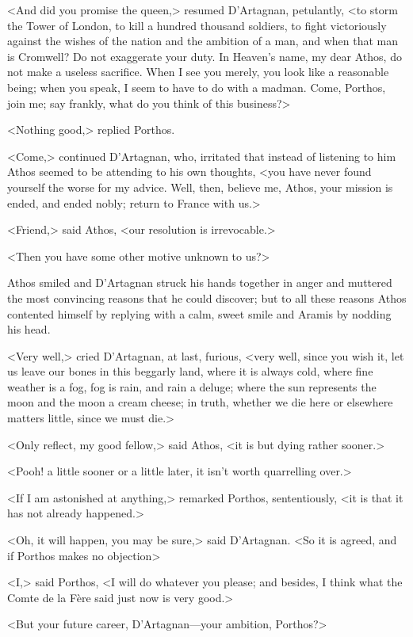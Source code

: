 <And did you promise the queen,> resumed D'Artagnan, petulantly, <to storm the Tower of London, to kill a hundred thousand soldiers, to fight victoriously against the wishes of the nation and the ambition of a man, and when that man is Cromwell? Do not exaggerate your duty. In Heaven's name, my dear Athos, do not make a useless sacrifice. When I see you merely, you look like a reasonable being; when you speak, I seem to have to do with a madman. Come, Porthos, join me; say frankly, what do you think of this business?>

<Nothing good,> replied Porthos.

<Come,> continued D'Artagnan, who, irritated that instead of listening to him Athos seemed to be attending to his own thoughts, <you have never found yourself the worse for my advice. Well, then, believe me, Athos, your mission is ended, and ended nobly; return to France with us.>

<Friend,> said Athos, <our resolution is irrevocable.>

<Then you have some other motive unknown to us?>

Athos smiled and D'Artagnan struck his hands together in anger and muttered the most convincing reasons that he could discover; but to all these reasons Athos contented himself by replying with a calm, sweet smile and Aramis by nodding his head.

<Very well,> cried D'Artagnan, at last, furious, <very well, since you wish it, let us leave our bones in this beggarly land, where it is always cold, where fine weather is a fog, fog is rain, and rain a deluge; where the sun represents the moon and the moon a cream cheese; in truth, whether we die here or elsewhere matters little, since we must die.>

<Only reflect, my good fellow,> said Athos, <it is but dying rather sooner.>

<Pooh! a little sooner or a little later, it isn't worth quarrelling over.>

<If I am astonished at anything,> remarked Porthos, sententiously, <it is that it has not already happened.>

<Oh, it will happen, you may be sure,> said D'Artagnan. <So it is agreed, and if Porthos makes no objection\longdash>

<I,> said Porthos, <I will do whatever you please; and besides, I think what the Comte de la Fère said just now is very good.>

<But your future career, D'Artagnan—your ambition, Porthos?>

